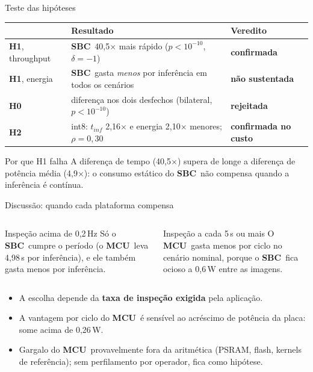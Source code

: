 \documentclass[aspectratio=169,11pt]{beamer}
\newcommand{\mcu}{\textcolor{roxo}{\textbf{MCU}}}
\newcommand{\sbc}{\textcolor{azul}{\textbf{SBC}}}
\newcommand{\destaque}[1]{\textcolor{azul}{\textbf{#1}}}
\begin{document}
\begin{frame}{Teste das hipóteses}
\small
\begin{tabularx}{\linewidth}{lLl}\toprule
 & Resultado & Veredito\\\midrule
\textbf{H1}, throughput & \sbc\ 40,5$\times$ mais rápido ($p<10^{-10}$, $\delta=-1$) & \textcolor{azul}{\textbf{confirmada}}\\
\textbf{H1}, energia & \sbc\ gasta \emph{menos} por inferência em todos os cenários & \textcolor{laranja}{\textbf{não sustentada}}\\
\textbf{H0} & diferença nos dois desfechos (bilateral, $p<10^{-10}$) & \textcolor{laranja}{\textbf{rejeitada}}\\
\textbf{H2} & int8: $t_{inf}$ 2,16$\times$ e energia 2,10$\times$ menores; $\rho=0{,}30$ & \textcolor{azul}{\textbf{confirmada no custo}}\\\bottomrule
\end{tabularx}
\vspace{0.35cm}
\begin{block}{Por que H1 falha}
A diferença de tempo (40,5$\times$) supera de longe a diferença de potência média (4,9$\times$): o consumo estático do
\sbc\ não compensa quando a inferência é contínua.
\end{block}
\end{frame}

\begin{frame}{Discussão: quando cada plataforma compensa}
\begin{columns}[T]
\begin{block}{Inspeção acima de 0,2\,Hz}
Só o \sbc\ cumpre o período (o \mcu\ leva 4,98\,s por inferência), e ele também gasta menos por inferência.
\end{block}
\begin{block}{Inspeção a cada 5\,s ou mais}
O \mcu\ gasta menos por ciclo no cenário nominal, porque o \sbc\ fica ocioso a 0,6\,W entre as imagens.
\end{block}
\end{columns}
\vspace{0.3cm}
\begin{itemize}\small
\item A escolha depende da \destaque{taxa de inspeção exigida} pela aplicação.
\item A vantagem por ciclo do \mcu\ é sensível ao acréscimo de potência da placa: some acima de 0,26\,W.
\item Gargalo do \mcu\ provavelmente fora da aritmética (PSRAM, flash, kernels de referência); sem perfilamento por operador, fica como hipótese.
\end{itemize}
\end{frame}
\end{document}
